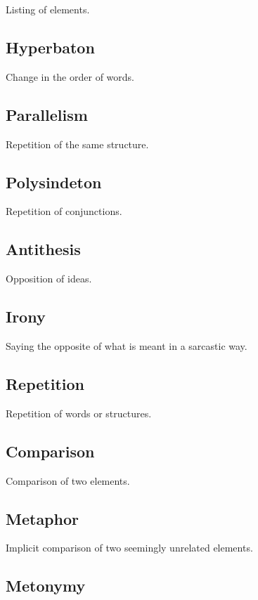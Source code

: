 \documentclass{article}
\begin{document}
Listing of elements.

\subsection*{Hyperbaton}

Change in the order of words.

\subsection*{Parallelism}

Repetition of the same structure.

\subsection*{Polysindeton}

Repetition of conjunctions.

\subsection*{Antithesis}

Opposition of ideas.

\subsection*{Irony}

Saying the opposite of what is meant in a sarcastic way.

\subsection*{Repetition}

Repetition of words or structures.

\subsection*{Comparison}

Comparison of two elements.

\subsection*{Metaphor}

Implicit comparison of two seemingly unrelated elements.

\subsection*{Metonymy}
\end{document}
